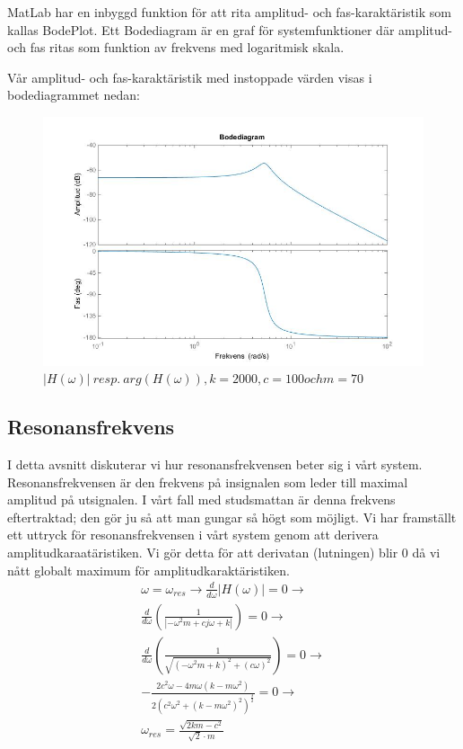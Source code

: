 \documentclass[10pt,a4paper]{article}
\begin{document}
MatLab har en inbyggd funktion för att rita amplitud- och fas-karaktäristik som kallas BodePlot. Ett Bodediagram är en graf för systemfunktioner där amplitud- och fas ritas som funktion av frekvens med logaritmisk skala.

Vår amplitud- och fas-karaktäristik med instoppade värden visas i bodediagrammet nedan:


\begin{figure}[h]
\begin{center}
\includegraphics[scale=0.5]{BodePlot(FasAmpKar)}
\caption{$|H(\omega)| \ resp. \ arg(H(\omega)), k = 2000, c = 100 och m = 70$ }
\end{center}
\end{figure}

\newpage


\subsection{Resonansfrekvens}
I detta avsnitt diskuterar vi hur resonansfrekvensen beter sig i vårt system. Resonansfrekvensen är den frekvens på insignalen som leder till maximal amplitud på utsignalen. I vårt fall med studsmattan är denna frekvens eftertraktad; den gör ju så att man gungar så högt som möjligt. Vi har framställt ett uttryck för resonansfrekvensen i vårt system genom att derivera amplitudkaraatäristiken. Vi gör detta för att derivatan (lutningen) blir 0 då vi nått globalt maximum för amplitudkaraktäristiken.
\begin{equation}
\begin{split}
\omega=\omega_{res} \rightarrow \frac{d}{d\omega}\left|H(\omega)\right|=0\rightarrow \\ 
\frac{d}{d\omega}\left(\frac{1}{\left|-\omega^2m+cj\omega+k\right|}\right)=0 \rightarrow \\
\frac{d}{d\omega}\left(\frac{1}{\sqrt{(-\omega^2m+k)^2+(c\omega)^2}}\right)=0 \rightarrow \\
-\frac{2c^2\omega-4m\omega(k-m\omega^2)}{2(c^2\omega^2+(k-m\omega^2)^2)^{\frac{3}{2}}}=0 \rightarrow \\
\omega_{res}= \frac{\sqrt{2km - c^2}}{\sqrt{2} \cdot m}
\end{split}
\end{equation}
\end{document}
